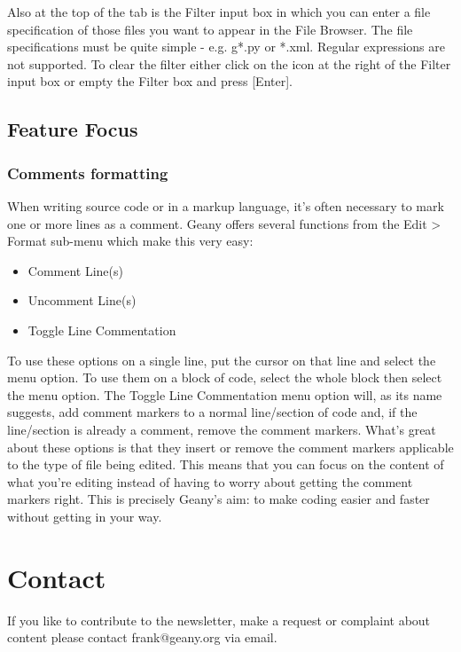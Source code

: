 \documentclass[%
paper=a4,%
fontsize=12pt,%
twoside=false,%
DIV18,
headsepline,
plainheadsepline,
footsepline,
plainfootsepline,
parskip=half,%
openany,%
]{scrartcl}
\begin{document}
Also at the top of the tab is the Filter input box in which you can
enter a file specification of those files you want to appear in the
File Browser. The file specifications must be quite simple - e.g.
g*.py or *.xml. Regular expressions are not supported. To clear the
filter either click on the icon at the right of the Filter input box
or empty the Filter box and press [Enter].



\subsection{Feature Focus}

\subsubsection{Comments formatting}

When writing source code or in a markup language, it's often
necessary to mark one or more lines as a comment. Geany offers
several functions from the Edit > Format sub-menu which make this
very easy:

\begin{itemize}
	\item Comment Line(s)
	\item Uncomment Line(s)
	\item Toggle Line Commentation
\end{itemize}

To use these options on a single line, put the cursor on that line
and select the menu option. To use them on a block of code, select
the whole block then select the menu option. The Toggle Line
Commentation menu option will, as its name suggests, add comment
markers to a normal line/section of code and, if the line/section is
already a comment, remove the comment markers. What's great about
these options is that they insert or remove the comment markers
applicable to the type of file being edited. This means that you can
focus on the content of what you're editing instead of having to
worry about getting the comment markers right. This is precisely
Geany's aim: to make coding easier and faster without getting in
your way.

\section{Contact}

If you like to contribute to the newsletter, make a request or
complaint about content please contact frank@geany.org via email.
\end{document}
